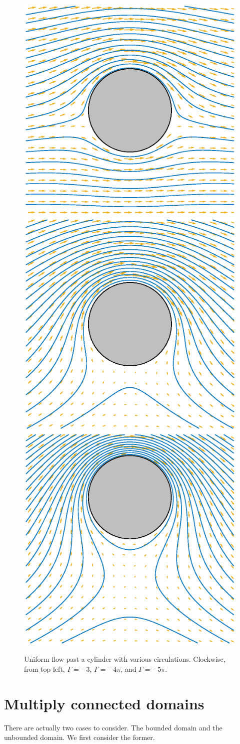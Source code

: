 \documentclass[12pt,fleqn]{article}
\begin{document}
\begin{figure}[htbp]
  \centering
  \includegraphics[width=.46\textwidth]{figures/onecirculate}
  \hspace{.02\textwidth}
  \includegraphics[width=.46\textwidth]{figures/circlebottom}
  \\\vspace*{.02\textwidth}
  \includegraphics[width=.46\textwidth]{figures/offcircle}
  \caption{Uniform flow past a cylinder with various circulations. Clockwise, from top-left, $\Gamma=-3$, $\Gamma=-4\pi$, and $\Gamma=-5\pi$.}
  \label{fig:onecirculate}
\end{figure}

\clearpage

\section{Multiply connected domains}
There are actually two cases to consider. The bounded domain and the unbounded domain. We first consider the former.
\end{document}
